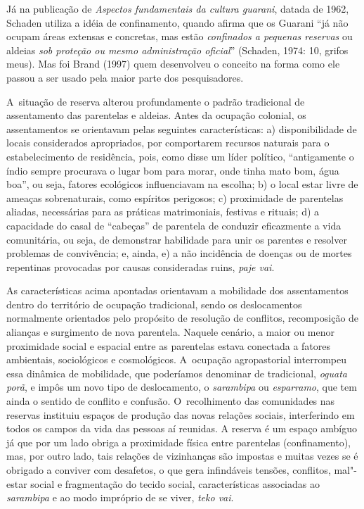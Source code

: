 Já na publicação de \emph{Aspectos fundamentais da cultura guarani}, datada de
1962, Schaden utiliza a idéia de confinamento, quando afirma que os
Guarani ``já não ocupam áreas extensas e concretas, mas estão \emph{confinados
a pequenas reservas} ou aldeias \emph{sob proteção ou mesmo administração
oficial}'' (Schaden, 1974: 10, grifos meus). Mas foi Brand (1997) quem
desenvolveu o conceito na forma como ele passou a ser usado pela maior
parte dos pesquisadores.

A~situação de reserva alterou profundamente o padrão tradicional de
assentamento das parentelas e aldeias. Antes da ocupação colonial, os
assentamentos se orientavam pelas seguintes características: a)
disponibilidade de locais considerados apropriados, por comportarem
recursos naturais para o estabelecimento de residência, pois, como
disse um líder político, ``antigamente o índio sempre procurava o lugar
bom para morar, onde tinha mato bom, água boa'', ou seja, fatores
ecológicos influenciavam na escolha; b) o local estar livre de ameaças
sobrenaturais, como espíritos perigosos; c) proximidade de parentelas
aliadas, necessárias para as práticas matrimoniais, festivas e rituais;
d) a capacidade do casal de ``cabeças'' de parentela de conduzir
eficazmente a vida comunitária, ou seja, de demonstrar habilidade para
unir os parentes e resolver problemas de convivência; e, ainda, e) a
não incidência de doenças ou de mortes repentinas provocadas por causas
consideradas ruins, \emph{paje vai}.

As características acima apontadas orientavam a mobilidade dos
assentamentos dentro do território de ocupação tradicional, sendo os
deslocamentos normalmente orientados pelo propósito de resolução de
conflitos, recomposição de alianças e surgimento de nova parentela.
Naquele cenário, a maior ou menor proximidade social e espacial entre
as parentelas estava conectada a fatores ambientais, sociológicos e
cosmológicos. A~ocupação agropastorial interrompeu essa dinâmica de
mobilidade, que poderíamos denominar de tradicional, \emph{oguata porã}, e
impôs um novo tipo de deslocamento, o \emph{sarambipa} ou \emph{esparramo}, que tem
ainda o sentido de conflito e confusão. O~recolhimento das comunidades
nas reservas instituiu espaços de produção das novas relações sociais,
interferindo em todos os campos da vida das pessoas aí reunidas. A
reserva é um espaço ambíguo já que por um lado obriga a proximidade
física entre parentelas (confinamento), mas, por outro lado, tais
relações de vizinhanças são impostas e muitas vezes se é obrigado a
conviver com desafetos, o que gera infindáveis tensões, conflitos,
mal"-estar social e fragmentação do tecido social, características
associadas ao \emph{sarambipa} e ao modo impróprio de se viver, \emph{teko vai}.

